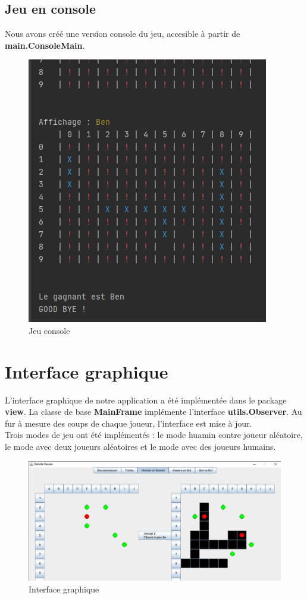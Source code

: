 \documentclass[a4paper, 12pt]{report}
\begin{document}
    \section{Jeu en console}
    Nous avons créé une version console du jeu, accesible à partir de \textbf{main.ConsoleMain}.
    \begin{figure}[h!]
        \centering
        \includegraphics[scale=0.5]{images/console.png}
        \caption{Jeu console}
        \label{fig:jeu_console_illustration}
    \end{figure}


    \chapter{Interface graphique}
    L'interface graphique de notre application a été implémentée dans le package \textbf{view}.
    La classe de base \textbf{MainFrame} implémente l'interface \textbf{utils.Observer}. Au fur à mesure des coups
    de chaque joueur, l'interface est mise à jour. \\

    Trois modes de jeu ont été implémentés : le mode huamin contre joueur aléatoire, le mode avec deux joueurs aléatoires
    et le mode avec des joueurs humains.

    \begin{figure}[h!]
        \centering
        \includegraphics[scale=0.4]{images/gui.png}
        \caption{Interface graphique}
        \label{fig:interface_graphique_illustration}
    \end{figure}
\end{document}
